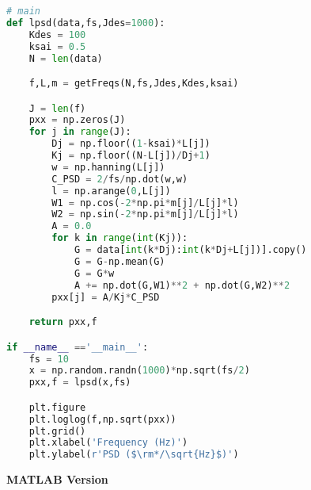 \begin{lstlisting}[language=Python]
# main
def lpsd(data,fs,Jdes=1000):
    Kdes = 100
    ksai = 0.5
    N = len(data)

    f,L,m = getFreqs(N,fs,Jdes,Kdes,ksai)

    J = len(f)
    pxx = np.zeros(J)
    for j in range(J):
        Dj = np.floor((1-ksai)*L[j])
        Kj = np.floor((N-L[j])/Dj+1)
        w = np.hanning(L[j])
        C_PSD = 2/fs/np.dot(w,w)
        l = np.arange(0,L[j])
        W1 = np.cos(-2*np.pi*m[j]/L[j]*l)
        W2 = np.sin(-2*np.pi*m[j]/L[j]*l)
        A = 0.0
        for k in range(int(Kj)):
            G = data[int(k*Dj):int(k*Dj+L[j])].copy()
            G = G-np.mean(G)
            G = G*w
            A += np.dot(G,W1)**2 + np.dot(G,W2)**2
        pxx[j] = A/Kj*C_PSD

    return pxx,f

if __name__ =='__main__':
    fs = 10
    x = np.random.randn(1000)*np.sqrt(fs/2)
    pxx,f = lpsd(x,fs)

    plt.figure
    plt.loglog(f,np.sqrt(pxx))
    plt.grid()
    plt.xlabel('Frequency (Hz)')
    plt.ylabel(r'PSD ($\rm*/\sqrt{Hz}$)')
\end{lstlisting}


{\noindent \bfseries MATLAB Version}


